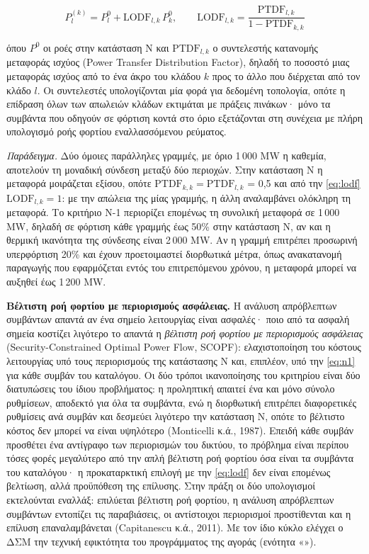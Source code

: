 \begin{equation}
P_l^{(k)} = P_l^{0} + \mathrm{LODF}_{l,k}\, P_k^{0}, \qquad
\mathrm{LODF}_{l,k} = \frac{\mathrm{PTDF}_{l,k}}{1 - \mathrm{PTDF}_{k,k}}
\label{eq:lodf}
\end{equation}

όπου $P^{0}$ οι ροές στην κατάσταση N και $\mathrm{PTDF}_{l,k}$ ο συντελεστής κατανομής
μεταφοράς ισχύος (Power Transfer Distribution Factor), δηλαδή το ποσοστό μιας μεταφοράς
ισχύος από το ένα άκρο του κλάδου $k$ προς το άλλο που διέρχεται από τον κλάδο $l$. Οι
συντελεστές υπολογίζονται μία φορά για δεδομένη τοπολογία, οπότε η επίδραση όλων των
απωλειών κλάδων εκτιμάται με πράξεις πινάκων· μόνο τα συμβάντα που οδηγούν σε φόρτιση κοντά
στο όριο εξετάζονται στη συνέχεια με πλήρη υπολογισμό ροής φορτίου εναλλασσόμενου ρεύματος.

\emph{Παράδειγμα.} Δύο όμοιες παράλληλες γραμμές, με όριο 1\,000 MW η καθεμία, αποτελούν τη
μοναδική σύνδεση μεταξύ δύο περιοχών. Στην κατάσταση N η μεταφορά μοιράζεται εξίσου, οπότε
$\mathrm{PTDF}_{k,k} = \mathrm{PTDF}_{l,k}$ = 0,5 και από την \eqref{eq:lodf}
$\mathrm{LODF}_{l,k} = 1$: με την απώλεια της μίας γραμμής, η άλλη αναλαμβάνει ολόκληρη τη
μεταφορά. Το κριτήριο N-1 περιορίζει επομένως τη συνολική μεταφορά σε 1\,000 MW, δηλαδή σε
φόρτιση κάθε γραμμής έως 50\% στην κατάσταση N, αν και η θερμική ικανότητα της σύνδεσης είναι
2\,000 MW. Αν η γραμμή επιτρέπει προσωρινή υπερφόρτιση 20\% και έχουν προετοιμαστεί
διορθωτικά μέτρα, όπως ανακατανομή παραγωγής που εφαρμόζεται εντός του επιτρεπόμενου χρόνου,
η μεταφορά μπορεί να αυξηθεί έως 1\,200 MW.

\textbf{Βέλτιστη ροή φορτίου με περιορισμούς ασφάλειας.} Η ανάλυση απρόβλεπτων συμβάντων απαντά
αν ένα σημείο λειτουργίας είναι ασφαλές· ποιο από τα ασφαλή σημεία κοστίζει λιγότερο το απαντά
η \emph{βέλτιστη ροή φορτίου με περιορισμούς ασφάλειας} (Security-Constrained Optimal Power
Flow, SCOPF): ελαχιστοποίηση του κόστους λειτουργίας υπό τους περιορισμούς της κατάστασης N
και, επιπλέον, υπό την \eqref{eq:n1} για κάθε συμβάν του καταλόγου. Οι δύο τρόποι ικανοποίησης
του κριτηρίου είναι δύο διατυπώσεις του ίδιου προβλήματος: η προληπτική απαιτεί ένα και μόνο
σύνολο ρυθμίσεων, αποδεκτό για όλα τα συμβάντα, ενώ η διορθωτική επιτρέπει διαφορετικές
ρυθμίσεις ανά συμβάν και δεσμεύει λιγότερο την κατάσταση N, οπότε το βέλτιστο κόστος δεν μπορεί
να είναι υψηλότερο (Monticelli κ.ά., 1987). Επειδή κάθε συμβάν προσθέτει ένα αντίγραφο των
περιορισμών του δικτύου, το πρόβλημα είναι περίπου τόσες φορές μεγαλύτερο από την απλή βέλτιστη
ροή φορτίου όσα είναι τα συμβάντα του καταλόγου· η προκαταρκτική
επιλογή με την \eqref{eq:lodf} δεν είναι επομένως βελτίωση, αλλά προϋπόθεση της επίλυσης. Στην
πράξη οι δύο υπολογισμοί εκτελούνται εναλλάξ: επιλύεται βέλτιστη ροή φορτίου, η ανάλυση
απρόβλεπτων συμβάντων εντοπίζει τις παραβιάσεις, οι αντίστοιχοι περιορισμοί προστίθενται και η
επίλυση επαναλαμβάνεται (Capitanescu κ.ά., 2011). Με τον ίδιο κύκλο ελέγχει ο ΔΣΜ την τεχνική εφικτότητα του
προγράμματος της αγοράς (ενότητα «»).

